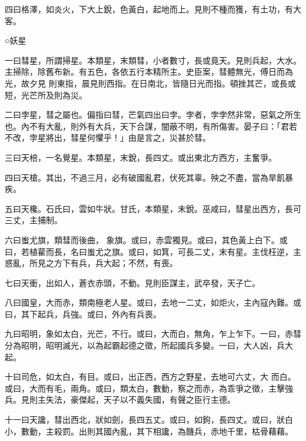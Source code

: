\begin{pinyinscope}
 四曰格澤，如炎火，下大上銳，色黃白，起地而上。見則不種而獲，有土功，有大客。



 ○妖星



 一曰彗星，所謂掃星。本類星，末類彗，小者數寸，長或竟天。見則兵起，大水。主掃除，除舊布新。有五色，各依五行本精所主。史臣案，彗體無光，傅日而為光，故夕見
 則東指，晨見則西指。在日南北，皆隨日光而指。頓挫其芒，或長或短，光芒所及則為災。



 二曰孛星，彗之屬也。偏指曰彗，芒氣四出曰孛。孛者，孛孛然非常，惡氣之所生也。內不有大亂，則外有大兵，天下合謀，闇蔽不明，有所傷害。晏子曰：「君若不改，孛星將出，彗星何懼乎！」由是言之，災甚於彗。



 三曰天棓，一名覺星。本類星，末銳，長四丈。或出東北方西方，主奮爭。



 四曰天槍。其出，不過三月，必有破國亂君，伏死其辜。殃之不盡，當為旱飢暴疾。



 五曰天欃。石氏曰，雲如牛狀。甘氏，本類星，末銳。巫咸曰，彗星出西方，長可三丈，主捕制。



 六曰蚩尤旗，類彗而後曲，
 象旗。或曰，赤雲獨見。或曰，其色黃上白下。或曰，若植雚而長，名曰蚩尤之旗。或曰，如箕，可長二丈，末有星。主伐枉逆，主惑亂，所見之方下有兵，兵大起；不然，有喪。



 七曰天衝，出如人，蒼衣赤頭，不動。見則臣謀主，武卒發，天子亡。



 八曰國皇，大而赤，類南極老人星。或曰，去地一二丈，如炬火，主內寇內難。或曰，其下起兵，兵強。或曰，外內有兵喪。



 九曰昭明，象如太白，光芒，不行。或曰，大而白，無角，乍上乍下。一曰，赤彗分為昭明，昭明滅光，以為起霸起德之徵，所起國兵多變。一曰，大人凶，兵大起。



 十曰司危，如太白，有目。或曰，出正西，西方之野星，去地可六丈，大
 而白。或曰，大而有毛，兩角。或曰，類太白，數動，察之而赤，為乖爭之徵，主擊強兵。見則主失法，豪傑起，天子以不義失國，有聲之臣行主德。



 十一曰天讒，彗出西北，狀如劍，長四五丈。或曰，如鉤，長四丈。或曰，狀白小，數動，主殺罰。出則其國內亂，其下相讒，為饑兵，赤地千里，枯骨藉藉。




\end{pinyinscope}
